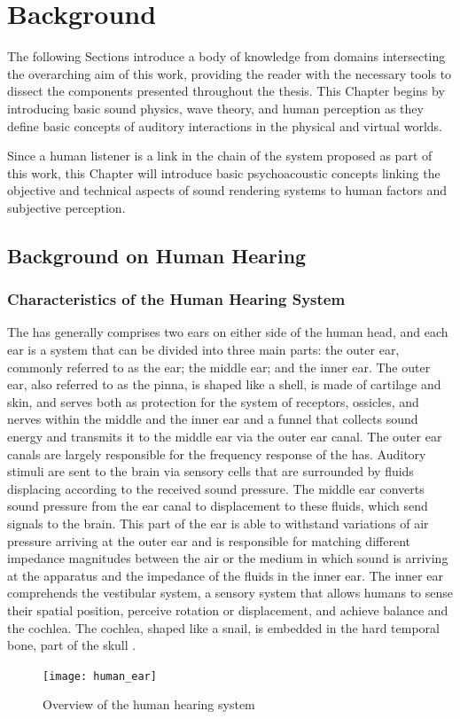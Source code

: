 \chapter{Background}\label{ch:Background}

The following Sections introduce a body of knowledge from domains intersecting the overarching aim of this work, providing the reader with the necessary tools to dissect the components presented throughout the thesis. This Chapter begins by introducing basic sound physics, wave theory, and human perception as they define basic concepts of auditory interactions in the physical and virtual worlds.\par
Since a human listener is a link in the chain of the system proposed as part of this work, this Chapter will introduce basic psychoacoustic concepts linking the objective and technical aspects of sound rendering systems to human factors and subjective perception.

\section{Background on Human Hearing}
\subsection{Characteristics of the Human Hearing System}
The \acrfull{has} generally comprises two ears on either side of the human head, and each ear is a system that can be divided into three main parts: the outer ear, commonly referred to as the ear; the middle ear; and the inner ear. The outer ear, also referred to as the pinna, is shaped like a shell, is made of cartilage and skin, and serves both as protection for the system of receptors, ossicles, and nerves within the middle and the inner ear and a funnel that collects sound energy and transmits it to the middle ear via the outer ear canal. The outer ear canals are largely responsible for the frequency response of the \acrshort{has}. 
Auditory stimuli are sent to the brain via sensory cells that are surrounded by fluids displacing according to the received sound pressure. The middle ear converts sound pressure from the ear canal to displacement to these fluids, which send signals to the brain. This part of the ear is able to withstand variations of air pressure arriving at the outer ear and is responsible for matching different impedance magnitudes between the air or the medium in which sound is arriving at the apparatus and the impedance of the fluids in the inner ear.
The inner ear comprehends the vestibular system, a sensory system that allows humans to sense their spatial position, perceive rotation or displacement, and achieve balance and the cochlea. The cochlea, shaped like a snail, is embedded in the hard temporal bone, part of the skull \citep{zwicker2013psychoacoustics}.
\begin{figure}
    \centering
    \texttt{[image: human\_ear]}
    \caption[Overview of the human hearing system]{Overview of the human hearing system \citep{zwicker2013psychoacoustics}}
    \label{fig:human_hearing_system}
\end{figure}

